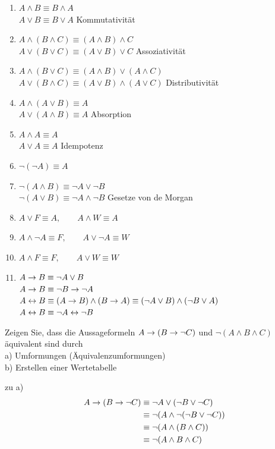 
\begin{enumerate}
	\item $A \land B \equiv B \land A$\\
	$A \lor B \equiv B \lor A$
	\hfill{Kommutativität}
	\item $A \land (B \land C) \equiv (A \land B) \land C$\\
	$A \lor (B \lor C) \equiv (A \lor B) \lor C$
	\hfill{Assoziativität}
	\item $A \land (B \lor C) \equiv (A \land B) \lor (A \land C)$\\
	$A \lor (B \land C) \equiv (A \lor B) \land (A \lor C)$
	\hfill{Distributivität}
	\item $A\land (A\lor B) \equiv A$\\
	$A\lor (A\land B) \equiv A$
	\hfill{Absorption}
	\item $A\land A \equiv A$\\
	$A\lor A \equiv A$
	\hfill{Idempotenz}
	\item $\neg(\neg A) \equiv A$
	\item $\neg(A\land B) \equiv \neg A \lor \neg B$\\
	$\neg(A\lor B) \equiv \neg A \land \neg B$
	\hfill{Gesetze von de Morgan}
	\item $A \lor F \equiv A, \qquad A\land W \equiv A$
	\item $A \land \neg A \equiv F, \qquad A\lor \neg A \equiv W$
	\item $A\land F \equiv F, \qquad A\lor W \equiv W$
	\item $A\rightarrow B \equiv \neg A \lor B$\\
	$A\rightarrow B \equiv \neg B \rightarrow \neg A$\\
	$A\leftrightarrow B \equiv (A\rightarrow B) \land (B\rightarrow A) \equiv (\neg A \lor B) \land (\neg B \lor A)$\\
	$A\leftrightarrow B \equiv \neg A \leftrightarrow \neg B$
\end{enumerate}

\Bsp Zeigen Sie, dass die Aussageformeln $A\rightarrow (B\rightarrow\neg C)$ und $\neg(A\land B\land C)$ äquivalent sind durch \\
a) Umformungen (Äquivalenzumformungen) \\
b) Erstellen einer Wertetabelle

zu a) 
\begin{align*}
A\rightarrow (B\rightarrow\neg C) &\equiv \neg A\lor (\neg B\lor\neg C)\\
&\equiv \neg (A\land \neg(\neg B\lor\neg C))\\
&\equiv \neg (A\land (B\land C))\\
&\equiv \neg (A\land B\land C)
\end{align*}

